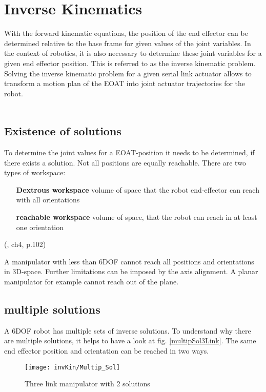 \section{Inverse Kinematics}

With the forward kinematic equations, the position of the end effector can be determined relative to the base frame for given values of the joint variables.
In the context of robotics, it is also necessary to determine these joint variables for a given end effector position.
This is referred to as the inverse kinematic problem.
Solving the inverse kinematic problem for a given serial link actuator allows to transform a motion plan of the \ac{EOAT} into joint actuator trajectories for the robot.\\
\\
\subsection{Existence of solutions} \label{ExistSol}
To determine the joint values for a \ac{EOAT}-position it needs to be determined, if there exists a solution.
Not all positions are equally reachable.
There are two types of workspace:
\begin{itemize}[wide=\parindent] 
	\item[\textbf{Dextrous workspace}] volume of space that the robot end-effector can reach with all orientations
	\item[\textbf{reachable workspace}] volume of space, that the robot can reach in at least one orientation
\end{itemize}
(\cite{craig1986introduction}, ch4, p.102)

A manipulator with less than 6\ac{DOF} cannot reach all positions and orientations in 3D-space. Further limitations can be imposed by the axis alignment. A planar manipulator for example cannot reach  out of the plane. \cite{craig1986introduction}

\subsection{multiple solutions} \label{MultipSol}
A 6\ac{DOF} robot has multiple sets of inverse solutions. To understand why there are multiple solutions, it helps to have a look at fig. \ref{multipSol3Link}. The same end effector position and orientation can be reached in two ways. 

\begin{figure}[H]
	\texttt{[image: invKin/Multip\_Sol]}
	\caption{Three link manipulator with 2 solutions}
	\label{fig:multipSol3Link}
\end{figure}

